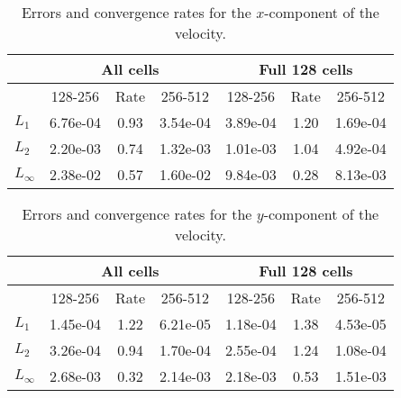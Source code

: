 
\begin{table}[htbp]
\begin{center}
\begin{tabular}{||l|c|c|c||c|c|c||} \hline
           & \multicolumn{3}{c||}{All cells} & \multicolumn{3}{c||}{Full 128 cells} \\ \hline
           & 128-256  & Rate & 256-512  & 128-256  & Rate & 256-512  \\ \hline
$L_1$      & 6.76e-04 & 0.93 & 3.54e-04 & 3.89e-04 & 1.20 & 1.69e-04 \\
$L_2$      & 2.20e-03 & 0.74 & 1.32e-03 & 1.01e-03 & 1.04 & 4.92e-04 \\
$L_\infty$ & 2.38e-02 & 0.57 & 1.60e-02 & 9.84e-03 & 0.28 & 8.13e-03 \\ \hline
\end{tabular}
\end{center}
\caption{Errors and convergence rates for the $x$-component of the velocity.}
\end{table}

\begin{table}[htbp]
\begin{center}
\begin{tabular}{||l|c|c|c||c|c|c||} \hline
           & \multicolumn{3}{c||}{All cells} & \multicolumn{3}{c||}{Full 128 cells} \\ \hline
           & 128-256  & Rate & 256-512  & 128-256  & Rate & 256-512  \\ \hline
$L_1$      & 1.45e-04 & 1.22 & 6.21e-05 & 1.18e-04 & 1.38 & 4.53e-05 \\
$L_2$      & 3.26e-04 & 0.94 & 1.70e-04 & 2.55e-04 & 1.24 & 1.08e-04 \\
$L_\infty$ & 2.68e-03 & 0.32 & 2.14e-03 & 2.18e-03 & 0.53 & 1.51e-03 \\ \hline
\end{tabular}
\end{center}
\caption{Errors and convergence rates for the $y$-component of the velocity.}
\end{table}
